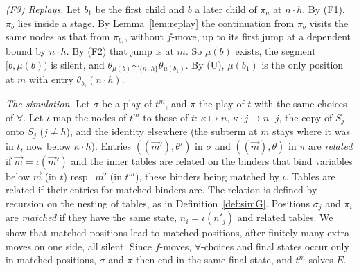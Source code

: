 \documentclass[11pt]{article}
\newcommand{\suc}[2]{#1{\cdot}#2}
\theoremstyle{plain}
\theoremstyle{definition}
\theoremstyle{remark}
\begin{document}
\emph{(F3) Replays.}  Let $b_1$ be the first child and $b$ a later
child of $\pi_a$ at $\suc nh$.  By (F1), $\pi_b$ lies inside a stage.
By Lemma~\ref{lem:replay} the continuation from $\pi_b$ visits the same
nodes as that from $\pi_{b_1}$, without $f$-move, up to its first jump
at a dependent bound by $\suc nh$.  By (F2) that jump is at $m$.  So
$\mu(b)$ exists, the segment $[b,\mu(b))$ is silent, and
$\theta_{\mu(b)}\sim_{\{\suc nh\}}\theta_{\mu(b_1)}$.  By (U),
$\mu(b_1)$ is the only position at $m$ with entry
$\theta_{b_1}(\suc nh)$.

\emph{The simulation.}  Let $\sigma$ be a play of $t^m$, and $\pi$ the
play of $t$ with the same choices of $\forall$.  Let $\iota$ map the
nodes of $t^m$ to those of $t$: $\kappa\mapsto n$,
$\suc\kappa j\mapsto\suc nj$, the copy of $S_j$ onto $S_j$ ($j\ne h$),
and the identity elsewhere (the subterm at $m$ stays where it was in
$t$, now below $\suc\kappa h$).  Entries $((\vec m'),\theta')$ in
$\sigma$ and $((\vec m),\theta)$ in $\pi$ are \emph{related} if
$\vec m=\iota(\vec m')$ and the inner tables are related on the binders
that bind variables below $\vec m$ (in $t$) resp.\ $\vec m'$ (in $t^m$),
these binders being matched by $\iota$.  Tables are related if their
entries for matched binders are.  The relation is defined by recursion
on the nesting of tables, as in Definition~\ref{def:simG}.  Positions
$\sigma_j$ and $\pi_i$ are \emph{matched} if they have the same state,
$n_i=\iota(n'_j)$ and related tables.  We show that matched positions
lead to matched positions, after finitely many extra moves on one side,
all silent.  Since $f$-moves, $\forall$-choices and final states occur
only in matched positions, $\sigma$ and $\pi$ then end in the same final
state, and $t^m$ solves $E$.
\end{document}

